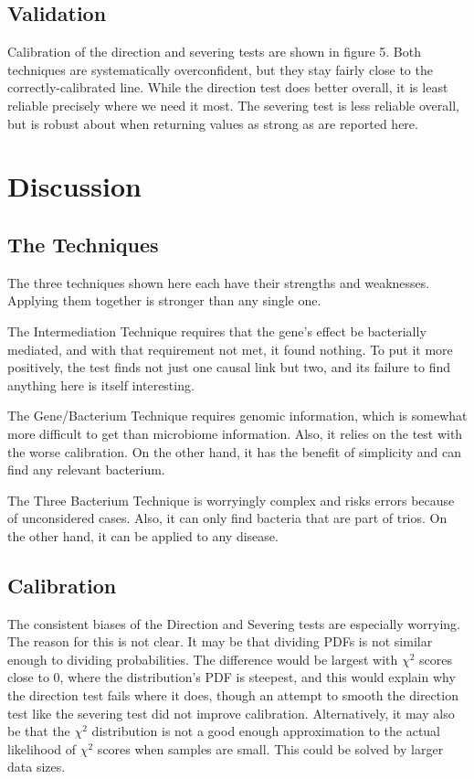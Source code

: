 \documentclass[a4paper]{article}
\begin{document}
\subsection{Validation}

Calibration of the direction and severing tests are shown in figure
5.  Both techniques are systematically overconfident, but they stay
fairly close to the
correctly-calibrated line.  While the direction test does better
overall, it is least reliable precisely where we need it most.  The
severing test is less reliable overall, but is robust about when
returning values as strong as are reported here.

\section{Discussion}

\subsection{The Techniques}

The three techniques shown here each have their strengths and
weaknesses.  Applying them together is stronger than any single one.

The Intermediation Technique requires that the gene's effect be
bacterially mediated, and with that requirement not met, it found
nothing.  To put it more positively, the test finds not just one
causal link but two, and its failure to find anything here is itself
interesting.

The Gene/Bacterium Technique requires genomic information, which is
somewhat more difficult to get than microbiome
information.  Also, it relies on the test with the worse calibration.
On the other hand, it has the benefit of simplicity and can find any
relevant bacterium.

The Three Bacterium Technique is worryingly complex and risks errors
because of unconsidered cases.  Also, it can only find bacteria that
are part of trios.  On the other hand, it can be applied to any
disease.

\subsection{Calibration}

The consistent biases of the Direction and Severing tests are
especially worrying.  The reason for this is not clear.  It may be
that dividing PDFs is not similar enough to dividing probabilities.
The difference would be largest with $\chi^2$ scores close to 0, where
the distribution's PDF is steepest, and this would explain why the
direction test fails where it does, though an attempt to smooth the
direction test like the severing test did not improve calibration.
Alternatively, it may also be that the $\chi^2$ distribution is not a
good enough approximation to the actual likelihood of $\chi^2$ scores
when samples are small.  This could be solved by larger data sizes.
\end{document}
